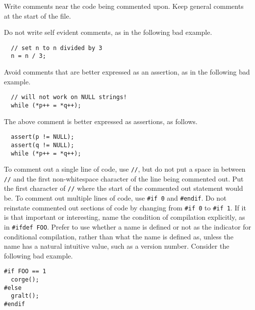 \documentclass{lulu}
\newcommand{\code}[1]{\texttt{#1}\xspace}
\begin{document}
Write comments near the code being commented upon.  Keep general
comments at the start of the file.

Do not write self evident comments, as in the following bad example.

\begin{samepage}
\begin{verbatim}
  // set n to n divided by 3
  n = n / 3;
\end{verbatim}
\end{samepage}

Avoid comments that are better expressed as an assertion, as in the
following bad example.

\begin{samepage}
\begin{verbatim}
  // will not work on NULL strings!
  while (*p++ = *q++);
\end{verbatim}
\end{samepage}

The above comment is better expressed as assertions, as follows.

\begin{samepage}
\begin{verbatim}
  assert(p != NULL);
  assert(q != NULL);
  while (*p++ = *q++);
\end{verbatim}
\end{samepage}

To comment out a single line of code, use \code{//}, but do not put a
space in between \code{//} and the first non-whitespace character of
the line being commented out.  Put the first character of \code{//}
where the start of the commented out statement would be.  To comment
out multiple lines of code, use \code{\#if 0} and \code{\#endif}.  Do
not reinstate commented out sections of code by changing from
\code{\#if 0} to \code{\#if 1}.  If it is that important or
interesting, name the condition of compilation explicitly, as in
\code{\#ifdef FOO}.  Prefer to use whether a name is defined or not as
the indicator for conditional compilation, rather than what the name
is defined as, unless the name has a natural intuitive value, such as
a version number.  Consider the following bad example.

\begin{samepage}
\begin{verbatim}
#if FOO == 1
  corge();
#else
  gralt();
#endif
\end{verbatim}
\end{samepage}
\end{document}
